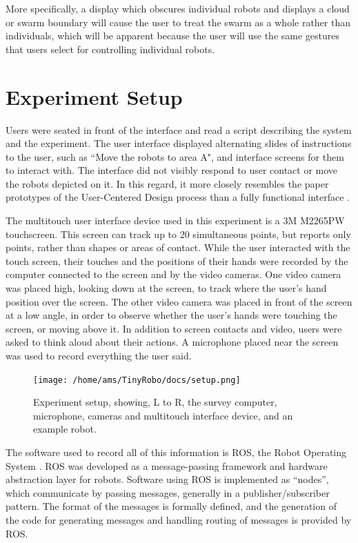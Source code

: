 More specifically, a display which obscures individual robots and displays a cloud or swarm boundary will cause the user to treat the swarm as a whole rather than individuals, which will be apparent because the user will use the same gestures that users select for controlling individual robots. 

\section{Experiment Setup} \label{section:Experiment_Setup}

Users were seated in front of the interface and read a script describing the system and the experiment. The user interface displayed alternating slides of instructions to the user, such as ``Move the robots to area A", and interface screens for them to interact with. 
The interface did not visibly respond to user contact or move the robots depicted on it.
In this regard, it more closely resembles the paper prototypes of the User-Centered Design process than a fully functional interface \citep{ehn1992cardboard}.

The multitouch user interface device used in this experiment is a 3M M2265PW touchscreen. 
This screen can track up to 20 simultaneous points, but reports only points, rather than shapes or areas of contact. 
While the user interacted with the touch screen, their touches and the positions of their hands were recorded by the computer connected to the screen and by the video cameras. 
One video camera was placed high, looking down at the screen, to track where the user's hand position over the screen. 
The other video camera was placed in front of the screen at a low angle, in order to observe whether the user's hands were touching the screen, or moving above it. 
In addition to screen contacts and video, users were asked to think aloud about their actions.
A microphone placed near the screen was used to record everything the user said. 

\begin{figure}
	\centering
	\texttt{[image: /home/ams/TinyRobo/docs/setup.png]}
	\caption{Experiment setup, showing, L to R, the survey computer, microphone, cameras and multitouch interface device, and an example robot.}
	\label{fig:experiment_setup}
\end{figure}

The software used to record all of this information is ROS, the Robot Operating System \citep{ROS_announcement_paper}. 
ROS was developed as a message-passing framework and hardware abstraction layer for robots. 
Software using ROS is implemented as ``nodes'', which communicate by passing messages, generally in a publisher/subscriber pattern. 
The format of the messages is formally defined, and the generation of the code for generating messages and handling routing of messages is provided by ROS. 

